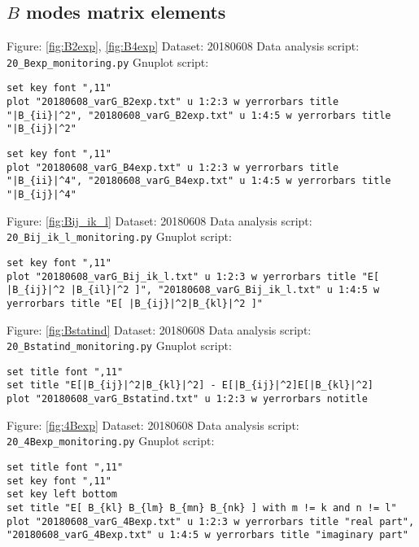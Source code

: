 \documentclass[12pt,a4paper]{article}
\begin{document}
\subsection{$B$ modes matrix elements}
Figure: \ref{fig:B2exp}, \ref{fig:B4exp} \newline
Dataset: 20180608\newline
Data analysis script: \verb|20_Bexp_monitoring.py|\newline
Gnuplot script:
\begin{lstlisting}
set key font ",11"
plot "20180608_varG_B2exp.txt" u 1:2:3 w yerrorbars title "|B_{ii}|^2", "20180608_varG_B2exp.txt" u 1:4:5 w yerrorbars title "|B_{ij}|^2"
\end{lstlisting}
\begin{lstlisting}
set key font ",11"
plot "20180608_varG_B4exp.txt" u 1:2:3 w yerrorbars title "|B_{ii}|^4", "20180608_varG_B4exp.txt" u 1:4:5 w yerrorbars title "|B_{ij}|^4"
\end{lstlisting}
\mbox{}\newline
Figure: \ref{fig:Bij_ik_l} \newline
Dataset: 20180608\newline
Data analysis script: \verb|20_Bij_ik_l_monitoring.py|\newline
Gnuplot script:
\begin{lstlisting}
set key font ",11"
plot "20180608_varG_Bij_ik_l.txt" u 1:2:3 w yerrorbars title "E[ |B_{ij}|^2 |B_{il}|^2 ]", "20180608_varG_Bij_ik_l.txt" u 1:4:5 w yerrorbars title "E[ |B_{ij}|^2|B_{kl}|^2 ]"
\end{lstlisting}
\mbox{}\newline
Figure: \ref{fig:Bstatind} \newline
Dataset: 20180608\newline
Data analysis script: \verb|20_Bstatind_monitoring.py|\newline
Gnuplot script:
\begin{lstlisting}
set title font ",11"
set title "E[|B_{ij}|^2|B_{kl}|^2] - E[|B_{ij}|^2]E[|B_{kl}|^2]
plot "20180608_varG_Bstatind.txt" u 1:2:3 w yerrorbars notitle
\end{lstlisting}
\mbox{}\newline
Figure: \ref{fig:4Bexp} \newline
Dataset: 20180608\newline
Data analysis script: \verb|20_4Bexp_monitoring.py|\newline
Gnuplot script:
\begin{lstlisting}
set title font ",11"
set key font ",11"
set key left bottom
set title "E[ B_{kl} B_{lm} B_{mn} B_{nk} ] with m != k and n != l"
plot "20180608_varG_4Bexp.txt" u 1:2:3 w yerrorbars title "real part", "20180608_varG_4Bexp.txt" u 1:4:5 w yerrorbars title "imaginary part"
\end{lstlisting}
\end{document}
